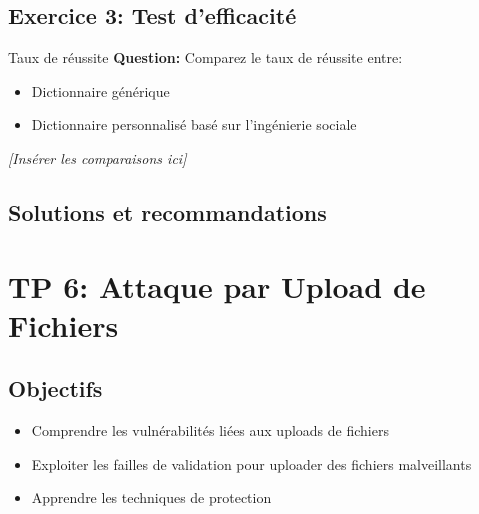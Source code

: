 \documentclass[12pt,a4paper]{article}
\begin{document}
\begin{answerbox}
\vspace{7cm}
\end{answerbox}

\subsection{Exercice 3: Test d'efficacité}

\begin{exercicebox}{Taux de réussite}
\textbf{Question:} Comparez le taux de réussite entre:
\begin{itemize}
    \item Dictionnaire générique
    \item Dictionnaire personnalisé basé sur l'ingénierie sociale
\end{itemize}
\end{exercicebox}

\begin{answerbox}
\vspace{7cm}
\end{answerbox}

\begin{screenshotbox}
\centering
\textit{[Insérer les comparaisons ici]}
\end{screenshotbox}

\subsection{Solutions et recommandations}

\begin{answerbox}
\vspace{7cm}
\end{answerbox}

\newpage

\section{TP 6: Attaque par Upload de Fichiers}

\subsection{Objectifs}
\begin{itemize}
    \item Comprendre les vulnérabilités liées aux uploads de fichiers
    \item Exploiter les failles de validation pour uploader des fichiers malveillants
    \item Apprendre les techniques de protection
\end{itemize}
\end{document}
